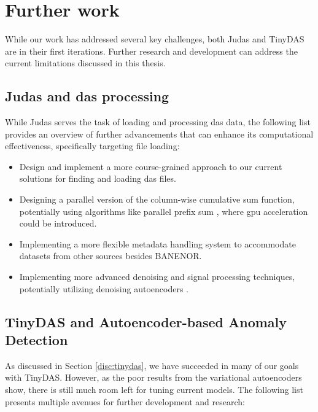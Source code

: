 \section{Further work}
\label{conc:further}

While our work has addressed several key challenges, both Judas and TinyDAS are in their first iterations. Further research and development can address the current limitations discussed in this thesis.

\subsection{Judas and \acrshort{das} processing}

While Judas serves the task of loading and processing \acrshort{das} data, the following list provides an overview of further advancements that can enhance its computational effectiveness, specifically targeting file loading:

\begin{itemize}
    \item Design and implement a more course-grained approach to our current solutions for finding and loading \acrshort{das} files. 
    \item Designing a parallel version of the column-wise cumulative sum function, potentially using algorithms like parallel prefix sum \cite{harris2007parallel}, where \acrshort{gpu} acceleration could be introduced. 
    \item Implementing a more flexible metadata handling system to accommodate datasets from other sources besides BANENOR.
    \item Implementing more advanced denoising and signal processing techniques, potentially utilizing denoising autoencoders \cite{eage:/content/journals/10.1111/1365-2478.13355}.
\end{itemize}

\subsection{TinyDAS and Autoencoder-based Anomaly Detection}

As discussed in Section \ref{disc:tinydas}, we have succeeded in many of our goals with TinyDAS. However, as the poor results from the variational autoencoders show, there is still much room left for tuning current models. The following list presents multiple avenues for further development and research:

